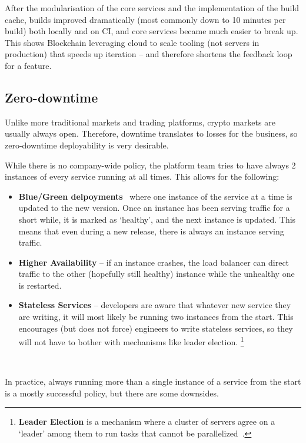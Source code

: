 \documentclass[conference]{IEEEtran}
\begin{document}
    After the modularisation of the core services and the implementation of the build cache, builds
    improved dramatically (most commonly down to 10 minutes per build) both locally and on CI, and
    core services became much easier to break up.
    This shows Blockchain leveraging cloud to scale tooling (not servers in production) that speeds
    up iteration -- and therefore shortens the feedback loop for a feature.

    \subsection{Zero-downtime}

    Unlike more traditional markets and trading platforms, crypto markets are usually always open.
    Therefore, downtime translates to losses for the business, so zero-downtime deployability is
    very desirable.

    While there is no company-wide policy, the platform team tries to have always 2 instances
    of every service running at all times.
    This allows for the following:

    \begin{itemize}
        \newcommand{\entry}[1]{\item[] \hspace{-1em}\textbf{#1}}
        \entry{Blue/Green delpoyments}~\cite{nomadBlueGreen} where one instance of the
        service at a time is updated to the new version.
        Once an instance has been serving traffic for a short while, it is marked as `healthy', and
        the next instance is updated.
        This means that even during a new release, there is always an instance serving traffic.
        \entry{Higher Availability} -- if an instance crashes, the load balancer can direct traffic
        to the other (hopefully still healthy) instance while the unhealthy one is restarted.
        \entry{Stateless Services} -- developers are aware that whatever new service they are
        writing, it will most likely be running two instances from the start.
        This encourages (but does not force) engineers to write stateless services, so they will not
        have to bother with mechanisms like leader election.
        \footnote{\textbf{Leader Election} is a mechanism where a cluster of servers agree on a
        `leader' among them to run tasks that cannot be parallelized~\cite{attiya2004distributed}.}
    \end{itemize}\

    In practice, always running more than a single instance of a service from the start is a mostly
    successful policy, but there are some downsides.
\end{document}
